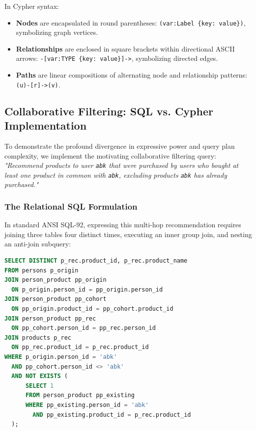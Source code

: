 \documentclass[10pt,twocolumn,letterpaper]{article}
\begin{document}
In Cypher syntax:
\begin{itemize}
    \item \textbf{Nodes} are encapsulated in round parentheses: \texttt{(var:Label \{key: value\})}, symbolizing graph vertices.
    \item \textbf{Relationships} are enclosed in square brackets within directional ASCII arrows: \texttt{-[var:TYPE \{key: value\}]->}, symbolizing directed edges.
    \item \textbf{Paths} are linear compositions of alternating node and relationship patterns: \texttt{(u)-[r]->(v)}.
\end{itemize}

\subsection{Collaborative Filtering: SQL vs. Cypher Implementation}
To demonstrate the profound divergence in expressive power and query plan complexity, we implement the motivating collaborative filtering query: \textit{"Recommend products to user \texttt{abk} that were purchased by users who bought at least one product in common with \texttt{abk}, excluding products \texttt{abk} has already purchased."}

\subsubsection{The Relational SQL Formulation}
In standard ANSI SQL-92, expressing this multi-hop recommendation requires joining three tables four distinct times, executing an inner group join, and nesting an anti-join subquery:

\begin{lstlisting}[language=SQL]
SELECT DISTINCT p_rec.product_id, p_rec.product_name
FROM persons p_origin
JOIN person_product pp_origin 
  ON p_origin.person_id = pp_origin.person_id
JOIN person_product pp_cohort 
  ON pp_origin.product_id = pp_cohort.product_id
JOIN person_product pp_rec 
  ON pp_cohort.person_id = pp_rec.person_id
JOIN products p_rec 
  ON pp_rec.product_id = p_rec.product_id
WHERE p_origin.person_id = 'abk'
  AND pp_cohort.person_id <> 'abk'
  AND NOT EXISTS (
      SELECT 1 
      FROM person_product pp_existing 
      WHERE pp_existing.person_id = 'abk' 
        AND pp_existing.product_id = p_rec.product_id
  );
\end{lstlisting}
\end{document}

